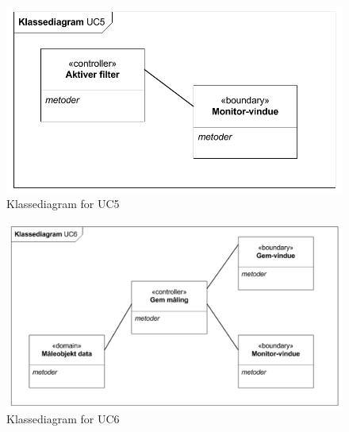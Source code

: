 \begin{figure}[H]
	\centering
	\includegraphics{Figurer/Snip20151104_41}
	\caption{Klassediagram for UC5}
\end{figure}

\begin{figure}[H]
	\centering
	\includegraphics{Figurer/Snip20151104_42}
	\caption{Klassediagram for UC6}
\end{figure}












